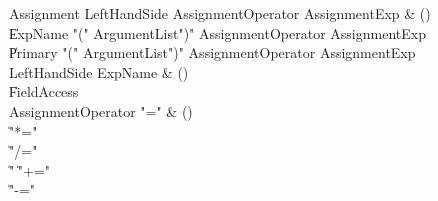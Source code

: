 \begin{bbgrammar}
 Assignment  \label{prod:Assignment}  \: LeftHandSide AssignmentOperator AssignmentExp & ()\\
    \| ExpName  \xcd"(" ArgumentList\opt \xcd")" AssignmentOperator AssignmentExp\\
    \| Primary  \xcd"(" ArgumentList\opt \xcd")" AssignmentOperator AssignmentExp\\
 LeftHandSide  \label{prod:LeftHandSide}  \: ExpName & ()\\
    \| FieldAccess\\
 AssignmentOperator  \label{prod:AssignmentOperator}  \: \xcd"=" & ()\\
    \| \xcd"*="\\
    \| \xcd"/="\\
    \| \xcd"%
    \| \xcd"+="\\
    \| \xcd"-="\\
\end{bbgrammar}

